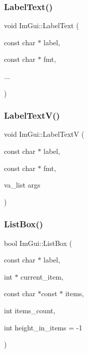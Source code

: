 \mbox{\label{namespace_im_gui_ad92ccfbc33d448ff40cfcf9219177344}} 
\subsubsection{\texorpdfstring{Label\+Text()}{LabelText()}}
{\footnotesize\ttfamily void Im\+Gui\+::\+Label\+Text (\begin{DoxyParamCaption}\item[{const char $\ast$}]{label,  }\item[{const char $\ast$}]{fmt,  }\item[{}]{... }\end{DoxyParamCaption})}

\mbox{\label{namespace_im_gui_a55e5a7edb676a8f5cd7f65443138a8a0}} 
\subsubsection{\texorpdfstring{Label\+Text\+V()}{LabelTextV()}}
{\footnotesize\ttfamily void Im\+Gui\+::\+Label\+TextV (\begin{DoxyParamCaption}\item[{const char $\ast$}]{label,  }\item[{const char $\ast$}]{fmt,  }\item[{va\+\_\+list}]{args }\end{DoxyParamCaption})}

\mbox{\label{namespace_im_gui_a93d68a6602e155134405ce17085501e9}} 
\subsubsection{\texorpdfstring{List\+Box()}{ListBox()}\hspace{0.1cm}{\footnotesize\ttfamily [1/2]}}
{\footnotesize\ttfamily bool Im\+Gui\+::\+List\+Box (\begin{DoxyParamCaption}\item[{const char $\ast$}]{label,  }\item[{int $\ast$}]{current\+\_\+item,  }\item[{const char $\ast$const $\ast$}]{items,  }\item[{int}]{items\+\_\+count,  }\item[{int}]{height\+\_\+in\+\_\+items = {\ttfamily -\/1} }\end{DoxyParamCaption})}

